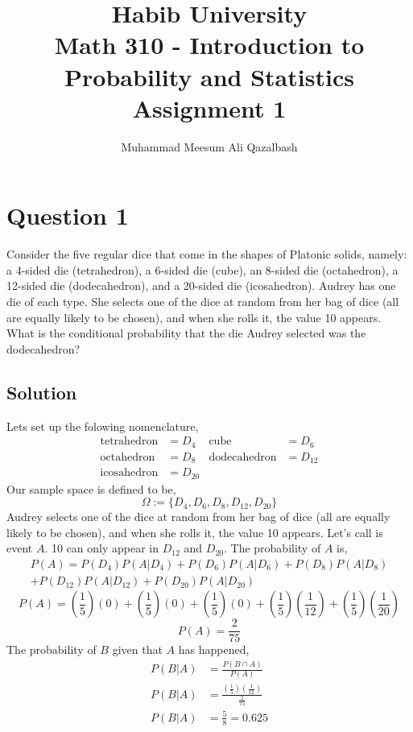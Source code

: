 \documentclass[a4paper, 11pt]{article}
\title{Habib University\\Math 310 - Introduction to Probability and Statistics\\Assignment 1}
\author{Muhammad Meesum Ali Qazalbash}
\begin{document}
\setlength{\parskip}{10pt}
\setlength{\parindent}{0pt}
\maketitle


\section*{Question 1}
Consider the five regular dice that come in the shapes of Platonic solids, namely:
a 4-sided die (tetrahedron), a 6-sided die (cube), an 8-sided die (octahedron), a 12-sided die
(dodecahedron),  and a 20-sided die (icosahedron).  Audrey has one die of each type.  She
selects one of the dice at random from her bag of dice (all are equally likely to be chosen),
and when she rolls it, the value 10 appears.  What is the conditional probability that the die
Audrey selected was the dodecahedron?
\subsection*{Solution}

Lets set up the folowing nomenclature,
\begin{align*}
    \text{tetrahedron} & = D_4    & \text{cube}         & = D_6    \\
    \text{octahedron}  & = D_8    & \text{dodecahedron} & = D_{12} \\
    \text{icosahedron} & = D_{20}
\end{align*}
Our sample space is defined to be,
\[\Omega := \{D_{4},D_{6},D_{8},D_{12},D_{20}\}\]
Audrey selects one of the dice at random from her bag of dice (all are equally likely to be chosen),
and when she rolls it, the value 10 appears. Let's call is event $A$. 10 can only appear in $D_{12}$
and $D_{20}$. The probability of $A$ is,
\begin{multline*}
    P(A)=P(D_{4})P(A|D_{4})+P(D_{6})P(A|D_{6})+P(D_{8})P(A|D_{8})\\
    +P(D_{12})P(A|D_{12})+P(D_{20})P(A|D_{20})
\end{multline*}
\[P(A)=\left(\frac{1}{5}\right)(0)+\left(\frac{1}{5}\right)(0)+\left(\frac{1}{5}\right)(0)
    +\left(\frac{1}{5}\right)\left(\frac{1}{12}\right)+\left(\frac{1}{5}\right)\left(\frac{1}{20}\right)\]
\[P(A)=\frac{2}{75}\]
The probability of $B$ given that
$A$ has happened,
\begin{equation*}
    \begin{split}
        P(B|A)&=\frac{P(B \cap A)}{P(A)}\\
        P(B|A)&=\frac{(\frac{1}{5})(\frac{1}{12})}{\frac{2}{75}}\\
        P(B|A)&=\frac{5}{8}=0.625
    \end{split}
\end{equation*}
\end{document}
